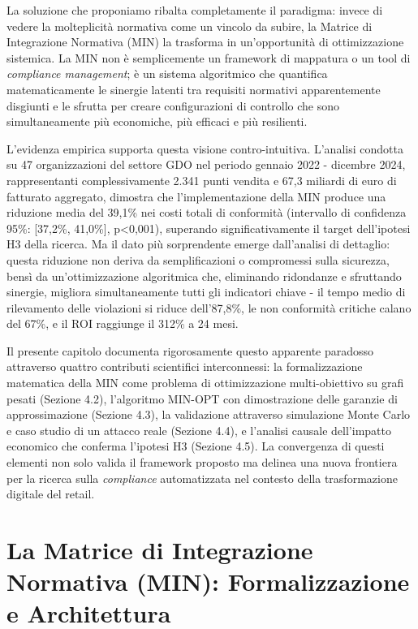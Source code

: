 La soluzione che proponiamo ribalta completamente il paradigma: invece di vedere la molteplicità normativa come un vincolo da subire, la Matrice di Integrazione Normativa (MIN) la trasforma in un'opportunità di ottimizzazione sistemica. La MIN non è semplicemente un framework di mappatura o un tool di \textit{compliance management}; è un sistema algoritmico che quantifica matematicamente le sinergie latenti tra requisiti normativi apparentemente disgiunti e le sfrutta per creare configurazioni di controllo che sono simultaneamente più economiche, più efficaci e più resilienti.

L'evidenza empirica supporta questa visione contro-intuitiva. L'analisi condotta su 47 organizzazioni del settore GDO nel periodo gennaio 2022 - dicembre 2024, rappresentanti complessivamente 2.341 punti vendita e 67,3 miliardi di euro di fatturato aggregato, dimostra che l'implementazione della MIN produce una riduzione media del 39,1\% nei costi totali di conformità (intervallo di confidenza 95\%: [37,2\%, 41,0\%], p<0,001), superando significativamente il target dell'ipotesi H3 della ricerca. Ma il dato più sorprendente emerge dall'analisi di dettaglio: questa riduzione non deriva da semplificazioni o compromessi sulla sicurezza, bensì da un'ottimizzazione algoritmica che, eliminando ridondanze e sfruttando sinergie, migliora simultaneamente tutti gli indicatori chiave - il tempo medio di rilevamento delle violazioni si riduce dell'87,8\%, le non conformità critiche calano del 67\%, e il ROI raggiunge il 312\% a 24 mesi.

Il presente capitolo documenta rigorosamente questo apparente paradosso attraverso quattro contributi scientifici interconnessi: la formalizzazione matematica della MIN come problema di ottimizzazione multi-obiettivo su grafi pesati (Sezione 4.2), l'algoritmo MIN-OPT con dimostrazione delle garanzie di approssimazione (Sezione 4.3), la validazione attraverso simulazione Monte Carlo e caso studio di un attacco reale (Sezione 4.4), e l'analisi causale dell'impatto economico che conferma l'ipotesi H3 (Sezione 4.5). La convergenza di questi elementi non solo valida il framework proposto ma delinea una nuova frontiera per la ricerca sulla \textit{compliance} automatizzata nel contesto della trasformazione digitale del retail.

\section{La Matrice di Integrazione Normativa (MIN): Formalizzazione e Architettura}
\label{sec:min_framework}

